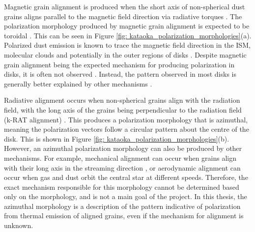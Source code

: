  

Magnetic grain alignment is produced when the short axis of non-spherical dust grains aligns parallel to the magnetic field direction via radiative torques  \citep{Andersson2015}. The polarization morphology produced by magnetic grain alignment is expected to be toroidal \citep{Stephens_2017}. This can be seen in Figure \ref{fig: kataoka_polarization_morphologies}(a). Polarized dust emission is known to trace the magnetic field direction in the ISM, molecular clouds and potentially in the outer regions of disks \citep{HullZhang2019}. Despite magnetic grain alignment being the expected mechanism for producing polarization in disks, it is often not observed \citep{sadavoy_dust_2019}. Instead, the pattern observed in most disks is generally better explained by other mechanisms  \citep{Lin2024}. 








Radiative alignment occurs when non-spherical grains align with the radiation field, with the long axis of the grains being perpendicular to the radiation field (k-RAT alignment) \citep{Tazaki2017}. This produces a polarization morphology that is azimuthal, meaning the polarization vectors follow a circular pattern about the centre of the disk. This is shown in Figure \ref{fig: kataoka_polarization_morphologies}(b). However, an azimuthal polarization morphology can also be produced by other mechanisms. For example, mechanical alignment can occur when grains align with their long axis in the streaming direction \citep{WurmBlum2000, Lin2024}, or aerodynamic alignment can occur when gas and dust orbit the central star at different speeds. Therefore, the exact mechanism responsible for this morphology cannot be determined based only on the morphology, and is not a main goal of the project. In this thesis, the azimuthal morphology is a description of the pattern indicative of polarization from thermal emission of aligned grains, even if the mechanism for alignment is unknown.








